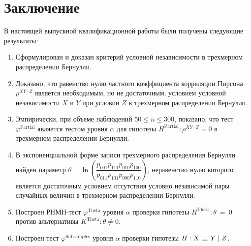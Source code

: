 \section*{Заключение}
В настоящей выпускной квалификационной работы 
были получены следующие результаты:
\begin{enumerate}
    \item Сформулирован и доказан критерий условной независимости
    в трехмерном распределении Бернулли.
    \item Доказано, что равенство нулю частного коэффициента корреляции 
    Пирсона $\rho^{XY \cdot Z}$ является
    необходимым, но не достаточным, условием
    условной независимости $X$ и $Y$ при 
    условии $Z$ в трехмерном распределении Бернулли.
    \item Эмпирически, при объеме наблюдений $50 \leq n \leq 300$,
    показано, что тест
    $\varphi^{\text{Partial}}$ является тестом уровня
    $\alpha$ для гипотезы $H^{\text{Partial}}: \rho^{XY\cdot Z}=0$ в трехмерном распределении
    Бернулли.
    \item В экспоненциальной форме записи трехмерного 
    распределения Бернулли найден параметр 
    $\theta = \ln  \left(\dfrac{p_{001}p_{111}p_{010}p_{100}}{p_{011}p_{101}p_{000}p_{110}}\right)$,
    неравенство нулю которого является достаточным 
    условием отсутствия условно независимой пары
    случайных величин в трехмерном распределении Бернулли.
    \item Построен РНМН-тест $\varphi^{\text{Theta}}$
    уровня $\alpha$ проверки гипотезы $H^{\text{Theta}}: \theta~=~0$
    против альтернативы $K^{\text{Theta}}: \theta\neq 0$.
    \item Построен тест $\varphi^{\text{Subsamples}}$ 
    уровня $\alpha$
    проверки гипотезы $H: X \perp\!\!\!\perp Y \mid Z$.
\end{enumerate}
